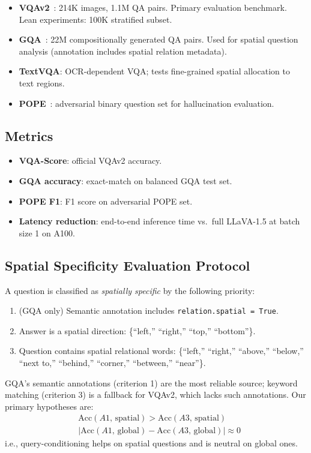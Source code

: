 \documentclass[12pt,a4paper]{article}
\begin{document}
\begin{itemize}[leftmargin=2em]
  \item \textbf{VQAv2}~\citep{goyal2017vqa}: 214K images, 1.1M QA pairs.
    Primary evaluation benchmark. Lean experiments: 100K stratified subset.
  \item \textbf{GQA}~\citep{hudson2019gqa}: 22M compositionally generated QA
    pairs. Used for spatial question analysis (annotation includes spatial
    relation metadata).
  \item \textbf{TextVQA}: OCR-dependent VQA; tests fine-grained spatial
    allocation to text regions.
  \item \textbf{POPE}~\citep{pope}: adversarial binary question set for
    hallucination evaluation.
\end{itemize}

\subsection{Metrics}

\begin{itemize}[leftmargin=2em]
  \item \textbf{VQA-Score}: official VQAv2 accuracy.
  \item \textbf{GQA accuracy}: exact-match on balanced GQA test set.
  \item \textbf{POPE F1}: F1 score on adversarial POPE set.
  \item \textbf{Latency reduction}: end-to-end inference time vs.\ full
    LLaVA-1.5 at batch size 1 on A100.
\end{itemize}

\subsection{Spatial Specificity Evaluation Protocol}

A question is classified as \emph{spatially specific} by the following priority:
\begin{enumerate}[leftmargin=2em]
  \item (GQA only) Semantic annotation includes \texttt{relation.spatial = True}.
  \item Answer is a spatial direction: \{``left,'' ``right,'' ``top,'' ``bottom''\}.
  \item Question contains spatial relational words:
    \{``left,'' ``right,'' ``above,'' ``below,'' ``next to,'' ``behind,''
    ``corner,'' ``between,'' ``near''\}.
\end{enumerate}
GQA's semantic annotations (criterion 1) are the most reliable source; keyword
matching (criterion 3) is a fallback for VQAv2, which lacks such annotations.
Our primary hypotheses are:
\begin{align}
  &\text{Acc}(A1,\, \mathrm{spatial}) > \text{Acc}(A3,\, \mathrm{spatial})
    \label{eq:hyp1} \\
  &|\text{Acc}(A1,\, \mathrm{global}) - \text{Acc}(A3,\, \mathrm{global})|
    \approx 0 \label{eq:hyp2}
\end{align}
i.e., query-conditioning helps on spatial questions and is neutral on global ones.
\end{document}
